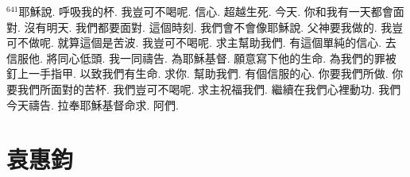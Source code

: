 \documentclass{book}
\begin{document}
$^{641}$耶穌說.
呼吸我的杯.
我豈可不喝呢.
信心.
超越生死.
今天.
你和我有一天都會面對.
沒有明天.
我們都要面對.
這個時刻.
我們會不會像耶穌說.
父神要我做的.
我豈可不做呢.
就算這個是苦波.
我豈可不喝呢.
求主幫助我們.
有這個單純的信心.
去信服他.
將同心低頭.
我一同禱告.
為耶穌基督.
願意寫下他的生命.
為我們的罪被釘上一手指甲.
以致我們有生命.
求你.
幫助我們.
有個信服的心.
你要我們所做.
你要我們所面對的苦杯.
我們豈可不喝呢.
求主祝福我們.
繼續在我們心裡動功.
我們今天禱告.
拉奉耶穌基督命求.
阿們.
\newpage



\chapter{袁惠鈞}\label{ch:preacher10}
\begin{multicols}{3}
\minitoc
\end{multicols}
\end{document}
